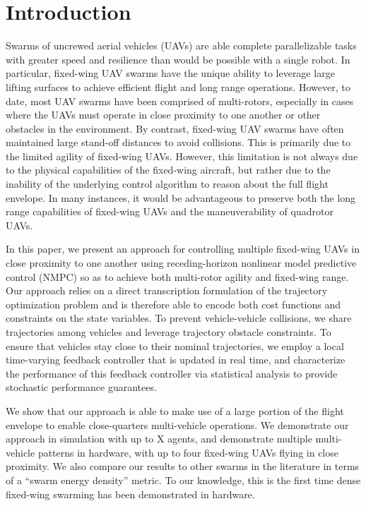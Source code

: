 \section{Introduction}

Swarms of uncrewed aerial vehicles (UAVs) are able complete parallelizable tasks with greater speed and resilience than would be possible with a single robot. In particular, fixed-wing UAV swarms have the unique ability to leverage large lifting surfaces to achieve efficient flight and long range operations. However, to date, most UAV swarms have been comprised of multi-rotors, especially in cases where the UAVs must operate in close proximity to one another or other obstacles in the environment. By contrast, fixed-wing UAV swarms have often maintained large stand-off distances to avoid collisions. This is primarily due to the limited agility of fixed-wing UAVs. However, this limitation is not always due to the physical capabilities of the fixed-wing aircraft, but rather due to the inability of the underlying control algorithm to reason about the full flight envelope. In many instances, it would be advantageous to preserve both the long range capabilities of fixed-wing UAVs and the maneuverability of quadrotor UAVs.

In this paper, we present an approach for controlling multiple fixed-wing UAVs in close proximity to one another using receding-horizon nonlinear model predictive control (NMPC) so as to achieve both multi-rotor agility and fixed-wing range. Our approach relies on a direct transcription formulation of the trajectory optimization problem and is therefore able to encode both cost functions and constraints on the state variables. To prevent vehicle-vehicle collisions, we share trajectories among vehicles and leverage trajectory obstacle constraints. To ensure that vehicles stay close to their nominal trajectories, we employ a local time-varying feedback controller that is updated in real time, and characterize the performance of this feedback controller via statistical analysis to provide stochastic performance guarantees. 

We show that our approach is able to make use of a large portion of the flight envelope to enable close-quarters multi-vehicle operations. We demonstrate our approach in simulation with up to X agents, and demonstrate multiple multi-vehicle patterns in hardware, with up to four fixed-wing UAVs flying in close proximity. We also compare our results to other swarms in the literature in terms of a ``swarm energy density'' metric. To our knowledge, this is the first time dense fixed-wing swarming has been demonstrated in hardware. 


